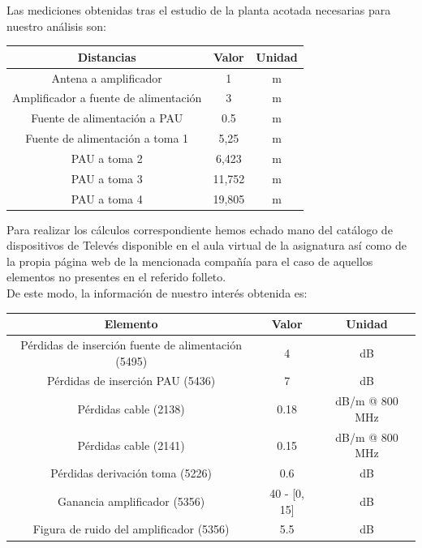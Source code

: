 \documentclass{article}[12 pt]
\begin{document}
			Las mediciones obtenidas tras el estudio de la planta acotada necesarias para nuestro análisis son:

			\vskip 3mm

			\begin{center}
				\begin{tabular}{| c | c | c |}
					\hline
					\textbf{Distancias} & \textbf{Valor} & \textbf{Unidad}\\
					\hline
					Antena a amplificador & 1 & m\\
					\hline
					Amplificador a fuente de alimentación & 3 & m\\
					\hline
					Fuente de alimentación a PAU & 0.5 & m\\
					\hline
					Fuente de alimentación a toma 1 & 5,25 & m\\
					\hline
					PAU a toma 2 & 6,423 & m\\
					\hline
					PAU a toma 3 & 11,752 & m\\
					\hline
					PAU a toma 4  & 19,805 & m\\
					\hline
				\end{tabular}
			\end{center}

			\vskip 3mm

			Para realizar los cálculos correspondiente hemos echado mano del catálogo de dispositivos de Televés disponible en el aula virtual de la asignatura así como de la propia página web de la mencionada compañía para el caso de aquellos elementos no presentes en el referido folleto.\\

			De este modo, la información de nuestro interés obtenida es:

			\vskip 3mm
			\begin{center}
				\begin{tabular}{| c | c | c |}
					\hline
					\textbf{Elemento} & \textbf{Valor} & \textbf{Unidad}\\
					\hline
					Pérdidas de inserción fuente de alimentación (5495) & 4 & dB\\
					\hline
					Pérdidas de inserción PAU (5436) & 7 & dB\\
					\hline
					Pérdidas cable (2138) & 0.18 & dB/m @ 800 MHz\\
					\hline
					Pérdidas cable (2141) & 0.15 & dB/m @ 800 MHz\\
					\hline
					Pérdidas derivación toma (5226) & 0.6 & dB\\
					\hline
					Ganancia amplificador (5356) & 40 - [0, 15] & dB\\
					\hline
					Figura de ruido del amplificador (5356) & 5.5 & dB\\
					\hline
				\end{tabular}
			\end{center}
\end{document}
